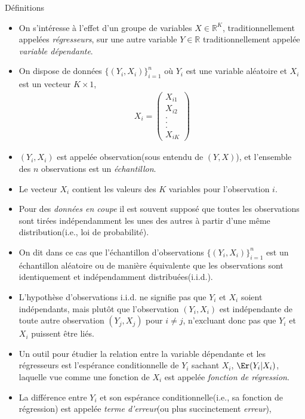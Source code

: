 \begin{frame}[allowframebreaks]{Définitions}
\begin{itemize}
\item On s'intéresse à l'effet d'un groupe de variables $X\in \mathbb{R}^K$, traditionnellement appelées \emph{régresseurs}, sur une autre variable $Y\in\mathbb{R}$ traditionnellement  appelée \emph{variable dépendante}. \item On dispose de données $\{(Y_i, X_i)\}_{i=1}^n$ où $Y_i$ est une variable aléatoire et $X_i$ est un vecteur $K\times 1$,
\begin{align*}
X_i = 
\left(
\begin{array}{c}
X_{i1}\\
X_{i2}\\
.\\
.\\
.\\
X_{iK}
\end{array}
\right)
\end{align*}
\item $(Y_i, X_i)$ est appelée observation(sous entendu de $(Y, X)$), et l'ensemble des $n$ observations est un 
\emph{échantillon}. 
\item Le vecteur $X_i$ contient les valeurs des $K$ variables pour l'observation $i$. 
\item Pour des \emph{données en coupe}  il est souvent supposé que toutes les observations sont tirées indépendamment les unes des autres à partir d'une même distribution(i.e., loi de probabilité). 
\item On dit dans ce cas que l'échantillon d'observations $\{(Y_i, X_i)\}_{i=1}^n$ est un échantillon aléatoire ou de manière équivalente que les observations sont identiquement et indépendamment distribuées(i.i.d.).
\item L'hypothèse d'observations i.i.d. ne signifie pas que $Y_i$ et $X_i$ soient indépendants, mais plutôt que l'observation $(Y_i, X_i)$ est indépendante de toute autre observation $(Y_j, X_j)$ pour $i\neq j$, n'excluant donc pas que $Y_i$ et $X_i$ puissent être liés.
\item Un outil pour étudier la relation entre la variable dépendante et les régresseurs est l'espérance conditionnelle de $Y_i$ sachant $X_i$, $\Er(Y_i| X_i)$, laquelle vue comme une fonction de $X_i$ est appelée \emph{fonction de régression}.\\
 \item La différence entre $Y_i$ et son espérance conditionnelle(i.e., sa fonction de régression) est appelée \emph{terme d'erreur}(ou plus succinctement \emph{erreur}),

\end{itemize}
\end{frame}
